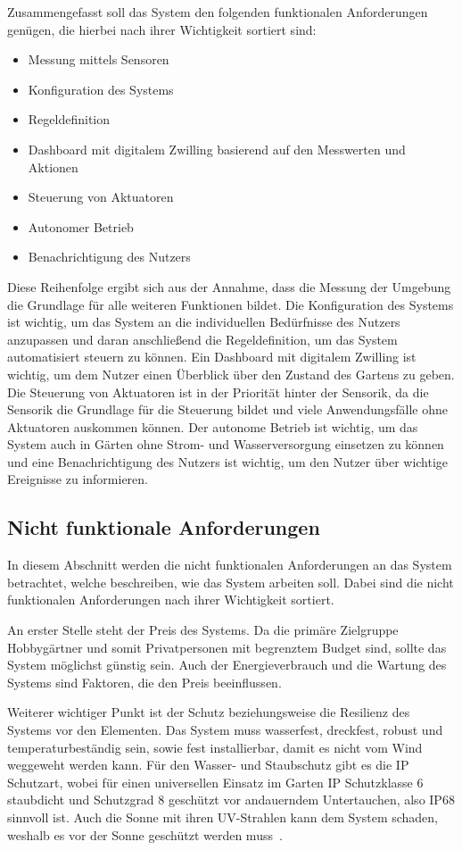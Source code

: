 Zusammengefasst soll das System den folgenden funktionalen Anforderungen genügen, die hierbei nach ihrer Wichtigkeit sortiert sind:
\begin{itemize}
	\item Messung mittels Sensoren
	\item Konfiguration des Systems
	\item Regeldefinition
	\item Dashboard mit digitalem Zwilling basierend auf den Messwerten und Aktionen
	\item Steuerung von Aktuatoren
	\item Autonomer Betrieb
	\item Benachrichtigung des Nutzers
\end{itemize}
Diese Reihenfolge ergibt sich aus der Annahme, dass die Messung der Umgebung die Grundlage für alle weiteren Funktionen bildet.
Die Konfiguration des Systems ist wichtig, um das System an die individuellen Bedürfnisse des Nutzers anzupassen und daran anschließend die Regeldefinition, um das System automatisiert steuern zu können.
Ein Dashboard mit digitalem Zwilling ist wichtig, um dem Nutzer einen Überblick über den Zustand des Gartens zu geben.
Die Steuerung von Aktuatoren ist in der Priorität hinter der Sensorik, da die Sensorik die Grundlage für die Steuerung bildet und viele Anwendungsfälle ohne Aktuatoren auskommen können.
Der autonome Betrieb ist wichtig, um das System auch in Gärten ohne Strom- und Wasserversorgung einsetzen zu können und eine Benachrichtigung des Nutzers ist wichtig, um den Nutzer über wichtige Ereignisse zu informieren.



\subsection{Nicht funktionale Anforderungen}
In diesem Abschnitt werden die nicht funktionalen Anforderungen an das System betrachtet, welche beschreiben, wie das System arbeiten soll.
Dabei sind die nicht funktionalen Anforderungen nach ihrer Wichtigkeit sortiert.

An erster Stelle steht der Preis des Systems.
Da die primäre Zielgruppe Hobbygärtner und somit Privatpersonen mit begrenztem Budget sind, sollte das System möglichst günstig sein.
Auch der Energieverbrauch und die Wartung des Systems sind Faktoren, die den Preis beeinflussen.

Weiterer wichtiger Punkt ist der Schutz beziehungsweise die Resilienz des Systems vor den Elementen.
Das System muss wasserfest, dreckfest, robust und temperaturbeständig sein, sowie fest installierbar, damit es nicht vom Wind weggeweht werden kann.
Für den Wasser- und Staubschutz gibt es die IP Schutzart, wobei für einen universellen Einsatz im Garten IP Schutzklasse 6 staubdicht und Schutzgrad 8 geschützt vor andauerndem Untertauchen, also IP68 sinnvoll ist.
Auch die Sonne mit ihren UV-Strahlen kann dem System schaden, weshalb es vor der Sonne geschützt werden muss~\cite{LichtPlastik,LichtPlastik2}.

